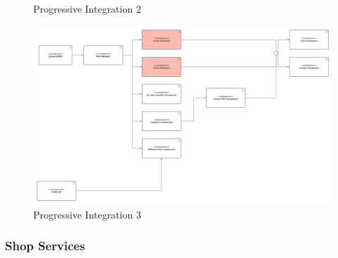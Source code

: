 \begin{itemize}
\begin{figure}[h!]
        \caption{\label{fig:QueueInternal2.1}{Progressive Integration 2}}
    \end{figure}
    \FloatBarrier 
    \begin{figure}[h!]
        \centering
        \includegraphics[width=.9\textwidth]{Images/TestDiagram/Queue/queueserviceprogressive/3.png}
        \caption{\label{fig:QueueInternal3}{Progressive Integration 3}}
    \end{figure}
    \FloatBarrier     
\end{itemize}

\subsubsection*{Shop Services}

